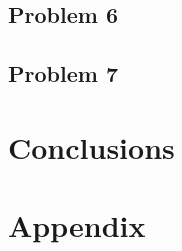 \documentclass[a4paper]{article}
\begin{document}
\subsection{Problem 6}
\lipsum[1]
\subsection{Problem 7}
\lipsum[1]

\section{Conclusions} \label{Conclusions}
\lipsum[1]

\section{Appendix}
\lipsum[1]



\end{document}
